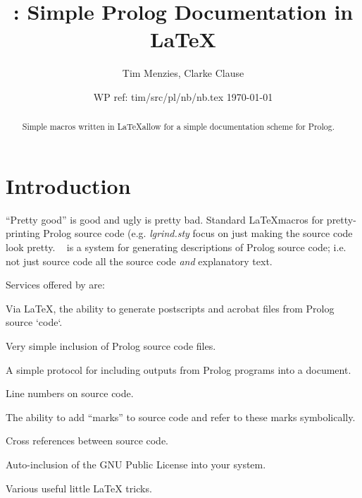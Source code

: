 \documentclass[twocolumn,global]{timlog/svjour}
\date{WP ref: tim/src/pl/nb/nb.tex \today} %
\begin{document}
\title{\TimLoG: Simple Prolog Documentation in \LaTeX }
\author{Tim Menzies, Clarke Clause}

 \maketitle
%

\thispagestyle{empty}  %
\pagestyle{plain} %

\begin{abstract}
Simple macros written in \LaTeX allow for a simple documentation
scheme for Prolog.
\end{abstract}

\section{Introduction}
``Pretty good'' is good and ugly  is pretty bad. Standard
\LaTeX macros for pretty-printing Prolog source code (e.g. {\em\newline
lgrind.sty} focus on just making the source code look pretty. \TimLoG~
is a system for generating descriptions of Prolog source code;
i.e. not just source
code all the source code {\em and} explanatory text.

Services offered by \TimLoG are: \bi \item Via \LaTeX, the ability to
generate postscripts and acrobat files from Prolog source `code`.
\item Very simple inclusion of Prolog source code files. \item A
simple protocol for including outputs from Prolog programs into a
document. \item Line numbers on source code. \item The ability to add
``marks'' to source code and refer to these marks symbolically. \item
Cross references between source code. \item Auto-inclusion of the GNU
Public License into your system. \item Various useful little \LaTeX
tricks. \ei
\end{document}
